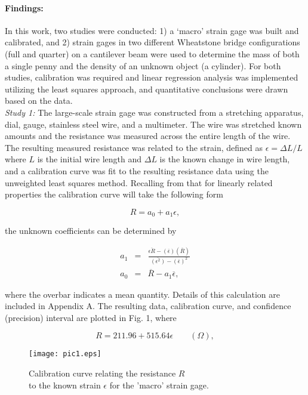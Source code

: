 \documentclass[12pt, letterpaper]{article}
\begin{document}
\paragraph{Findings:}
In this work, two studies were conducted: 1) a `macro'
strain gage was built and calibrated, and 2) strain gages in two different
Wheatstone bridge configurations (full and quarter) on a cantilever beam were
used to determine the mass of both a single penny and the density of an
unknown object (a cylinder). For both studies, calibration was required and
linear regression analysis was implemented utilizing the least squares
approach, and quantitative conclusions were drawn based on the data. \\

\textit{Study 1:} The large-scale strain gage was constructed from a
stretching apparatus, dial, gauge, stainless steel wire, and a
multimeter. The wire was stretched known amounts and the resistance was
measured across the entire length of the wire. The resulting measured
resistance was related to the strain, defined as $\epsilon = \Delta L/L$
where $L$ is the initial wire length and $\Delta L$ is the known change
in wire length, and a calibration curve was fit to the resulting
resistance data using the unweighted least squares method. Recalling
from \cite{ame} that for linearly related  properties the
calibration curve will take the following form

\begin{equation}
R = a_0 + a_1\epsilon,
\end{equation}

the unknown coefficients can be determined by

\begin{eqnarray}
   a _1 &=& \frac{\overline{\epsilon R}
     -(\overline{\epsilon})(\overline{R})}{\overline{(\epsilon^2)}
     -(\overline{\epsilon})^2} \\
     a_0 &=& \overline{R} - a_1 \overline{\epsilon},
\end{eqnarray}

where the overbar indicates a mean quantity. Details of this calculation are
included in Appendix A. The resulting data, calibration curve, and confidence
(precision) interval are plotted in Fig. 1, where

\begin{equation}
R = 211.96 + 515.64 \epsilon  \qquad (\Omega),
\end{equation}

\begin{figure}[h!]
\begin{center}
\texttt{[image: pic1.eps]}
\caption{Calibration curve relating the resistance $R$ \\ to the known strain
              $\epsilon$ for the 'macro' strain gage.}
\label{pic1.fig}
\end{center}
\end{figure}
\end{document}
